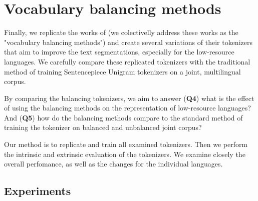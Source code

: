 \chapter{Vocabulary balancing methods}
\label{chap:experiment_3_balancing}



Finally, we replicate the works of \citet{chung_improving_2020,zheng_allocating_2021,liang_xlm-v_2023} (we colectivelly address these works as the "vocabulary balancing methods") and create several variations of their tokenizers that aim to improve the text segmentations, especially for the low-resource languages. We carefully compare these replicated tokenizers with the traditional method of training Sentencepiece Unigram tokenizers on a joint, multilingual corpus.

By comparing the balancing tokenizers, we aim to answer (\textbf{Q4}) what is the effect of using the balancing methods on the representation of low-resource languages? And (\textbf{Q5}) how do the balancing methods compare to the standard method of training the tokenizer on balanced and unbalanced joint corpus?

Our method is to replicate and train all examined tokenizers. Then we perform the intrinsic and extrinsic evaluation of the tokenizers. We examine closely the overall perfomance, as well as the changes for the individual languages.




\section{Experiments}


